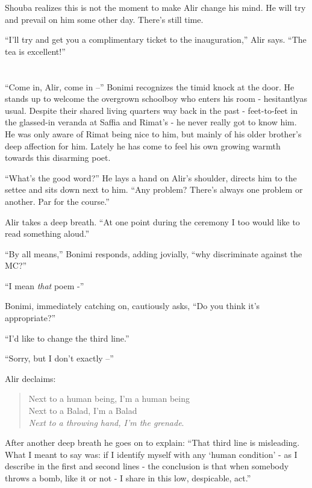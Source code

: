 \documentclass[twoside,11pt]{book}
\begin{document}
Shouba realizes this is not the moment to make Alir change his mind. He will try and prevail on him some other day.
There's still time.

``I'll try and get you a complimentary ticket to the inauguration,'' Alir says.
``The tea is excellent!''



\chapter{}

``Come in, Alir, come in --'' Bonimi recognizes the timid knock at the door. He stands up to
welcome the overgrown schoolboy who enters his room - hesitantlyas usual. Despite their shared living quarters way back
in the past - feet-to-feet in the glassed-in veranda at Saffia and Rimat's - he never really got to
know him. He was only aware of Rimat being nice to him, but mainly of his older brother's deep affection for him.
Lately he has come to feel his own growing warmth towards this disarming poet.

``What's the good word?'' He lays a hand on Alir's shoulder, directs him to the settee and
sits down next to him. ``Any problem? There's always one problem or another. Par for the
course.''

Alir takes a deep breath. ``At one point during the ceremony I too would like to read something
aloud.''

``By all means,'' Bonimi responds, adding jovially, ``why discriminate against
the MC?''

``I mean \textit{that} poem -''

Bonimi, immediately catching on, cautiously asks, ``Do you think it's appropriate?''

``I'd like to change the third line.''

``Sorry, but I don't exactly --''

Alir declaims:
\begin{verse}
  Next to a human being, I'm a human being \\
  Next to a Balad, I'm a Balad \\
  \textit{Next to a throwing hand, I'm the grenade}.
\end{verse}
After another deep breath he goes on to explain:
``That third line is misleading. What I meant to say was:  if I identify myself with any `human condition'
- as I describe in the first and second lines -  the conclusion is that when somebody throws a  bomb,  like it or not -
I share in this low, despicable, act.''
\end{document}
